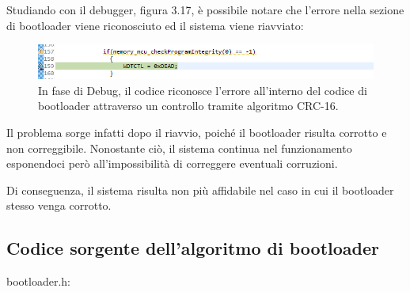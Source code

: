 \documentclass[LaM,binding=0.6cm,oneside]{../sapthesis}
\begin{document}
Studiando con il debugger, figura 3.17, è possibile notare che l’errore nella sezione di bootloader viene riconosciuto ed il sistema viene riavviato:

\begin{figure}[htbp]
\centerline{\includegraphics[scale=0.64]{examples/DebugCorruption.PNG}}
\caption{In fase di Debug, il codice riconosce l'errore all'interno del codice di bootloader attraverso un controllo tramite algoritmo CRC-16.}
\label{fig}
\end{figure}
\newline

Il problema sorge infatti dopo il riavvio, poiché il bootloader risulta corrotto e non correggibile. Nonostante ciò, il sistema continua nel funzionamento esponendoci però all’impossibilità di correggere eventuali corruzioni. 

Di conseguenza, il sistema risulta non più affidabile nel caso in cui il bootloader stesso venga corrotto.

\clearpage
\subsection{Codice sorgente dell'algoritmo di bootloader}

bootloader.h:
\end{document}
